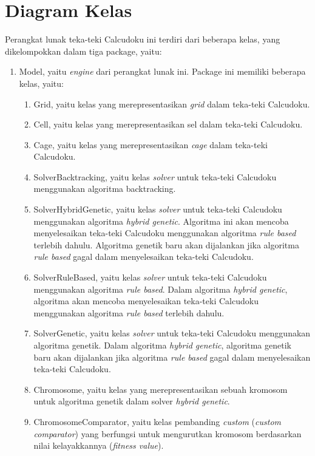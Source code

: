 \section{Diagram Kelas}
\label{sec:diagramkelas}

Perangkat lunak teka-teki Calcudoku ini terdiri dari beberapa kelas, yang dikelompokkan dalam tiga package, yaitu:

\begin{enumerate}
\item Model, yaitu \textit{engine} dari perangkat lunak ini. Package ini memiliki beberapa kelas, yaitu:
	\begin{enumerate}
	\item Grid, yaitu kelas yang merepresentasikan \textit{grid} dalam teka-teki Calcudoku.
	\item Cell, yaitu kelas yang merepresentasikan sel dalam teka-teki Calcudoku.
	\item Cage, yaitu kelas yang merepresentasikan \textit{cage} dalam teka-teki Calcudoku.
	\item SolverBacktracking, yaitu kelas \textit{solver} untuk teka-teki Calcudoku menggunakan algoritma backtracking.
	\item SolverHybridGenetic, yaitu kelas \textit{solver} untuk teka-teki Calcudoku menggunakan algoritma \textit{hybrid genetic}. Algoritma ini akan mencoba menyelesaikan teka-teki Calcudoku menggunakan algoritma \textit{rule based} terlebih dahulu. Algoritma genetik baru akan dijalankan jika algoritma \textit{rule based} gagal dalam menyelesaikan teka-teki Calcudoku.
	\item SolverRuleBased, yaitu kelas \textit{solver} untuk teka-teki Calcudoku menggunakan algoritma \textit{rule based}. Dalam algoritma \textit{hybrid genetic}, algoritma akan mencoba menyelesaikan teka-teki Calcudoku menggunakan algoritma \textit{rule based} terlebih dahulu.
	\item SolverGenetic, yaitu kelas \textit{solver} untuk teka-teki Calcudoku menggunakan algoritma genetik. Dalam algoritma \textit{hybrid genetic}, algoritma genetik baru akan dijalankan jika algoritma \textit{rule based} gagal dalam menyelesaikan teka-teki Calcudoku.
	\item Chromosome, yaitu kelas yang merepresentasikan sebuah kromosom untuk algoritma genetik dalam solver \textit{hybrid genetic}.
	\item ChromosomeComparator, yaitu kelas pembanding \textit{custom} (\textit{custom comparator}) yang berfungsi untuk mengurutkan kromosom berdasarkan nilai kelayakkannya (\textit{fitness value}).	

\end{enumerate}
\end{enumerate}
